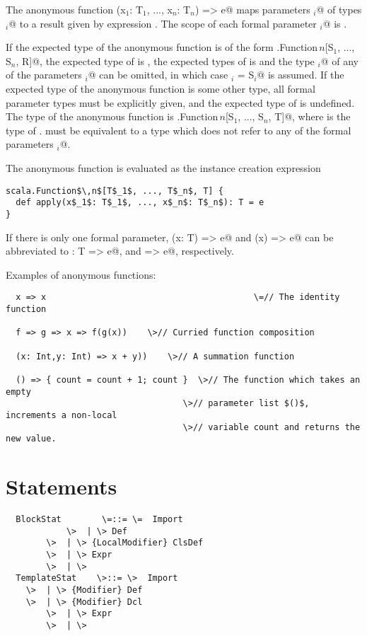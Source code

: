 \documentclass[11pt]{report}
\begin{document}
The anonymous function \verb@(x$_1$: T$_1$, ..., x$_n$: T$_n$) => e@
maps parameters \verb@x$_i$@ of types \verb@T$_i$@ to a result given
by expression \verb@e@. The scope of each formal parameter
\verb@x$_i$@ is \verb@e@.

If the expected type of the anonymous function is of the form
\verb@scala.Function$\,n$[S$_1$, ..., S$_n$, R]@, the expected type of \verb@e@
is \verb@R@, the expected types of \verb@e@ is \verb@R@ and the type
\verb@T$_i$@ of any of the parameters \verb@x$_i$@ can be omitted, in
which case \verb@T$_i$ = S$_i$@ is assumed. If the expected type of
the anonymous function is some other type, all formal parameter types
must be explicitly given, and the expected type of \verb@e@ is
undefined. The type of the anonymous function is
\verb@scala.Function$\,n$[S$_1$, ..., S$_n$, T]@, where \verb@T@ is
the type of \verb@e@. \verb@T@ must be equivalent to a type which does
not refer to any of the formal parameters \verb@x$_i$@.

The anonymous function is evaluated as the instance creation expression
\begin{verbatim}
scala.Function$\,n$[T$_1$, ..., T$_n$, T] {
  def apply(x$_1$: T$_1$, ..., x$_n$: T$_n$): T = e
}
\end{verbatim}
If there is only one formal parameter, \verb@(x: T) => e@ and \verb@(x) => e@
can be abbreviated to \verb@x: T => e@, and \verb@x => e@, respectively.

\example Examples of anonymous functions:

\begin{verbatim}
  x => x                                         \=// The identity function

  f => g => x => f(g(x))	\>// Curried function composition

  (x: Int,y: Int) => x + y))    \>// A summation function

  () => { count = count + 1; count }  \>// The function which takes an empty
                                   \>// parameter list $()$, increments a non-local
                                   \>// variable count and returns the new value.
\end{verbatim}

\section{Statements}
\label{sec:statements}

\syntax\begin{verbatim}
  BlockStat        \=::= \=  Import
            \>  | \> Def
	    \>  | \> {LocalModifier} ClsDef
	    \>  | \> Expr
	    \>  | \>
  TemplateStat    \>::= \>  Import
   	\>  | \> {Modifier} Def
	\>  | \> {Modifier} Dcl
        \>  | \> Expr
	    \>  | \>
\end{verbatim}
\end{document}

